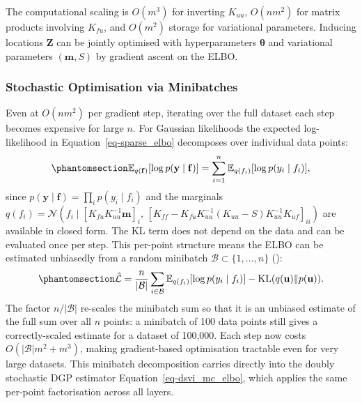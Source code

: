 \documentclass[
  letterpaper,
  DIV=11,
  numbers=noendperiod]{scrartcl}
\begin{document}
The computational scaling is \(O(m^3)\) for inverting \(K_{uu}\),
\(O(nm^2)\) for matrix products involving \(K_{fu}\), and \(O(m^2)\)
storage for variational parameters. Inducing locations \(\mathbf{Z}\)
can be jointly optimised with hyperparameters \(\boldsymbol{\theta}\)
and variational parameters \((\mathbf{m}, S)\) by gradient ascent on the
ELBO.

\subsubsection{Stochastic Optimisation via
Minibatches}\label{stochastic-optimisation-via-minibatches}

Even at \(O(nm^2)\) per gradient step, iterating over the full dataset
each step becomes expensive for large \(n\). For Gaussian likelihoods
the expected log-likelihood in Equation~\ref{eq-sparse_elbo} decomposes
over individual data points:
\begin{equation}\phantomsection\label{eq-ell_decomposition}{
\mathbb{E}_{q(\mathbf{f})}[\log p(\mathbf{y} \mid \mathbf{f})] = \sum_{i=1}^n \mathbb{E}_{q(f_i)}[\log p(y_i \mid f_i)],
}\end{equation} since
\(p(\mathbf{y} \mid \mathbf{f}) = \prod_i p(y_i \mid f_i)\) and the
marginals
\(q(f_i) = \mathcal{N}(f_i \mid [K_{fu}K_{uu}^{-1}\mathbf{m}]_i,\, [K_{ff} - K_{fu}K_{uu}^{-1}(K_{uu}-S)K_{uu}^{-1}K_{uf}]_{ii})\)
are available in closed form. The KL term does not depend on the data
and can be evaluated once per step. This per-point structure means the
ELBO can be estimated unbiasedly from a random minibatch
\(\mathcal{B} \subset \{1,\ldots,n\}\)
(): \begin{equation}\phantomsection\label{eq-sparse_minibatch_elbo}{
\hat{\mathcal{L}} = \frac{n}{|\mathcal{B}|} \sum_{i \in \mathcal{B}} \mathbb{E}_{q(f_i)}[\log p(y_i \mid f_i)] - \operatorname{KL}(q(\mathbf{u}) \| p(\mathbf{u})).
}\end{equation} The factor \(n/|\mathcal{B}|\) re-scales the minibatch
sum so that it is an unbiased estimate of the full sum over all \(n\)
points: a minibatch of 100 data points still gives a correctly-scaled
estimate for a dataset of 100,000. Each step now costs
\(O(|\mathcal{B}|m^2 + m^3)\), making gradient-based optimisation
tractable even for very large datasets. This minibatch decomposition
carries directly into the doubly stochastic DGP estimator
Equation~\ref{eq-dsvi_mc_elbo}, which applies the same per-point
factorisation across all layers.
\end{document}
